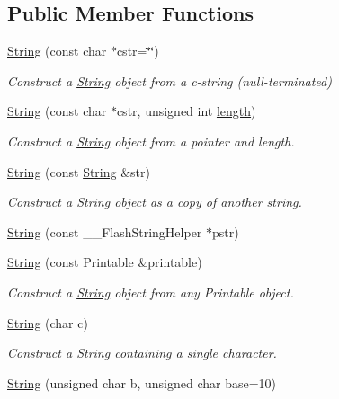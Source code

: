 \subsection*{Public Member Functions}
\begin{DoxyCompactItemize}
\item 
\hyperlink{class_string_a9c6238ddd5e2dca198ead5227fc7b858}{String} (const char $\ast$cstr=\char`\"{}\char`\"{})
\begin{DoxyCompactList}\small\item\em Construct a \hyperlink{class_string}{String} object from a c-\/string (null-\/terminated) \end{DoxyCompactList}\item 
\hyperlink{class_string_a20cfefac6f5b37f40dcb35826b563a5a}{String} (const char $\ast$cstr, unsigned int \hyperlink{class_string_a21691d4bac5ec852977018fef6fb9c8a}{length})
\begin{DoxyCompactList}\small\item\em Construct a \hyperlink{class_string}{String} object from a pointer and length. \end{DoxyCompactList}\item 
\hyperlink{class_string_a5774bcd4a4c232a8aec5a3ec6d01a157}{String} (const \hyperlink{class_string}{String} \&str)
\begin{DoxyCompactList}\small\item\em Construct a \hyperlink{class_string}{String} object as a copy of another string. \end{DoxyCompactList}\item 
\hyperlink{class_string_a8c89c89e3cb69407bf55443c3d9dce0c}{String} (const \+\_\+\+\_\+\+Flash\+String\+Helper $\ast$pstr)
\item 
\hyperlink{class_string_ad61d0ac2a1ff6e81fc7da8097be3c4dd}{String} (const Printable \&printable)
\begin{DoxyCompactList}\small\item\em Construct a \hyperlink{class_string}{String} object from any Printable object. \end{DoxyCompactList}\item 
\hyperlink{class_string_a1fdfe981d2c5e0075c1669dd94553082}{String} (char c)
\begin{DoxyCompactList}\small\item\em Construct a \hyperlink{class_string}{String} containing a single character. \end{DoxyCompactList}\item 
\hyperlink{class_string_adb05525482f5991815322239e5504539}{String} (unsigned char b, unsigned char base=10)

\end{DoxyCompactItemize}
